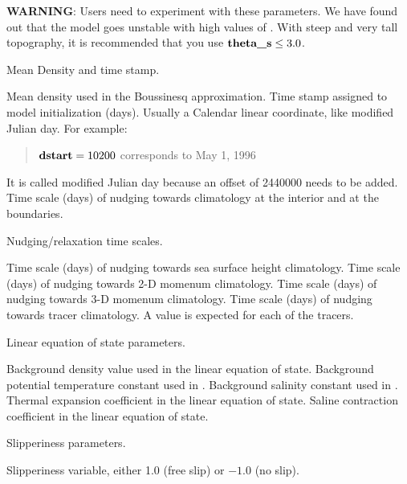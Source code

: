 \begin{klist}
\begin{klist}
       {\bf WARNING}: Users need to experiment with these parameters. We
                     have found out that the model goes unstable with
                     high values of .  With steep and
                     very tall topography, it is recommended that you
                     use $\mbox{\bf theta\_s} \leq 3.0$.
     \end{klist}
     Mean Density and time stamp.
     \begin{klist}
            Mean density used in the Boussinesq
     approximation.
          Time stamp assigned to model initialization
     (days).  Usually a Calendar linear coordinate, like modified
     Julian day. For example:
     \begin{quote}
               $\mbox{\bf dstart}=10200$   corresponds to   May 1, 1996
     \end{quote}
     It is called modified Julian day because an offset of 2440000
     needs to be added.
           Time scale (days) of nudging towards
     climatology at the interior and at the boundaries.
     \end{klist}
     Nudging/relaxation time scales.
     \begin{klist}
           Time scale (days) of nudging towards
     sea surface height climatology.
           Time scale (days) of nudging towards
     2-D momenum climatology.
           Time scale (days) of nudging towards
     3-D momenum climatology.
           Time scale (days) of nudging towards
     tracer climatology.
     A value is expected for each of the  tracers.
     \end{klist}
     Linear equation of state parameters.
     \begin{klist}
              Background density value used in
    the linear equation of state.
              Background potential temperature constant used
    in .
              Background salinity constant used
    in .
           Thermal expansion coefficient in the linear
    equation of state.
           Saline contraction coefficient in the linear
    equation of state.
     \end{klist}
     Slipperiness parameters.
     \begin{klist}
          Slipperiness variable, either 1.0 (free
     slip) or $-1.0$ (no slip).

\end{klist}
\end{klist}
